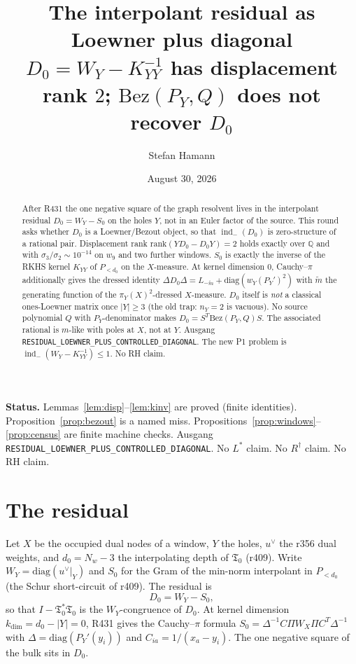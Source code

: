 \documentclass[11pt]{article}
\title{\bfseries The interpolant residual as Loewner plus diagonal\\[2mm]
\large $D_0=W_Y-K_{YY}^{-1}$ has displacement rank $2$;
$\mathrm{Bez}(P_Y,Q)$ does not recover $D_0$}
\author{Stefan Hamann}
\date{August 30, 2026}
\theoremstyle{remark}
\newcommand{\Tfrak}{\mathfrak{T}}
\newcommand{\indm}{\operatorname{ind}_{-}}
\begin{document}
\maketitle

\begin{abstract}\noindent
After R431 the one negative square of the graph resolvent
lives in the interpolant residual $D_0=W_Y-S_0$ on the
holes $Y$, not in an Euler factor of the source.
This round asks whether $D_0$ is a Loewner/Bezout object,
so that $\indm(D_0)$ is zero-structure of a rational pair.
Displacement rank $\mathrm{rank}(YD_0-D_0Y)=2$ holds
exactly over $\mathbb{Q}$ and with $\sigma_3/\sigma_2\sim 10^{-14}$
on $w_9$ and two further windows.
$S_0$ is exactly the inverse of the RKHS kernel $K_{YY}$ of
$P_{<d_0}$ on the $X$-measure.
At kernel dimension $0$, Cauchy--$\pi$ additionally gives
the dressed identity
$\Delta D_0\Delta=L_{-\widetilde{m}}+\mathrm{diag}(w_Y(P_Y')^2)$
with $\widetilde{m}$ the generating function of the
$\pi_Y(X)^2$-dressed $X$-measure.
$D_0$ itself is \emph{not} a classical ones-Loewner matrix
once $|Y|\ge 3$ (the old trap: $n_Y=2$ is vacuous).
No source polynomial $Q$ with $P_Y$-denominator makes
$D_0=S^T\mathrm{Bez}(P_Y,Q)S$.
The associated rational is $m$-like with poles at $X$,
not at $Y$.
Ausgang \texttt{RESIDUAL\_LOEWNER\_PLUS\_CONTROLLED\_DIAGONAL}.
The new P1 problem is $\indm(W_Y-K_{YY}^{-1})\le 1$.
No RH claim.
\end{abstract}

\medskip\noindent
\textbf{Status.}\enspace
Lemmas~\ref{lem:disp}--\ref{lem:kinv} are proved (finite
identities).
Proposition~\ref{prop:bezout} is a named miss.
Propositions~\ref{prop:windows}--\ref{prop:census} are
finite machine checks.
Ausgang \texttt{RESIDUAL\_LOEWNER\_PLUS\_CONTROLLED\_DIAGONAL}.
No $L^*$ claim.  No $R^\dagger$ claim.  No RH claim.

\section{The residual}

Let $X$ be the occupied dual nodes of a window, $Y$ the
holes, $u^\vee$ the r356 dual weights, and $d_0=N_w-3$ the
interpolating depth of $\Tfrak_0$ (r409).
Write $W_Y=\mathrm{diag}(u^\vee|_Y)$ and $S_0$ for the
Gram of the min-norm interpolant in $P_{<d_0}$ (the
Schur short-circuit of r409).
The residual is
\begin{equation}\label{eq:D0}
D_0=W_Y-S_0,
\end{equation}
so that $I-\Tfrak_0^*\Tfrak_0$ is the $W_Y$-congruence of
$D_0$.
At kernel dimension $k_{\dim}=d_0-|Y|=0$, R431 gives the
Cauchy--$\pi$ formula
$S_0=\Delta^{-1}C\Pi W_X\Pi C^T\Delta^{-1}$ with
$\Delta=\mathrm{diag}(P_Y'(y_i))$ and $C_{ia}=1/(x_a-y_i)$.
The one negative square of the bulk sits in $D_0$.
\end{document}
